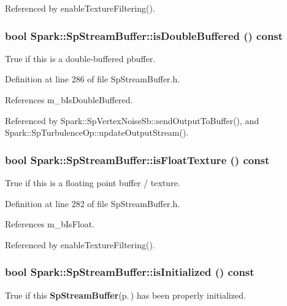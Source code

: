 Referenced by enable\-Texture\-Filtering().
\subsubsection{\setlength{\rightskip}{0pt plus 5cm}bool Spark::Sp\-Stream\-Buffer::is\-Double\-Buffered () const\hspace{0.3cm}{\tt  [inline]}}\label{classSpark_1_1SpStreamBuffer_a34}


True if this is a double-buffered pbuffer. 

Definition at line 286 of file Sp\-Stream\-Buffer.h.

References m\_\-b\-Is\-Double\-Buffered.

Referenced by Spark::Sp\-Vertex\-Noise\-Sb::send\-Output\-To\-Buffer(), and Spark::Sp\-Turbulence\-Op::update\-Output\-Stream().
\subsubsection{\setlength{\rightskip}{0pt plus 5cm}bool Spark::Sp\-Stream\-Buffer::is\-Float\-Texture () const\hspace{0.3cm}{\tt  [inline]}}\label{classSpark_1_1SpStreamBuffer_a33}


True if this is a floating point buffer / texture. 

Definition at line 282 of file Sp\-Stream\-Buffer.h.

References m\_\-b\-Is\-Float.

Referenced by enable\-Texture\-Filtering().
\subsubsection{\setlength{\rightskip}{0pt plus 5cm}bool Spark::Sp\-Stream\-Buffer::is\-Initialized () const\hspace{0.3cm}{\tt  [inline]}}\label{classSpark_1_1SpStreamBuffer_a30}


True if this {\bf Sp\-Stream\-Buffer}{\rm (p.\,\pageref{classSpark_1_1SpStreamBuffer})} has been properly initialized. 

